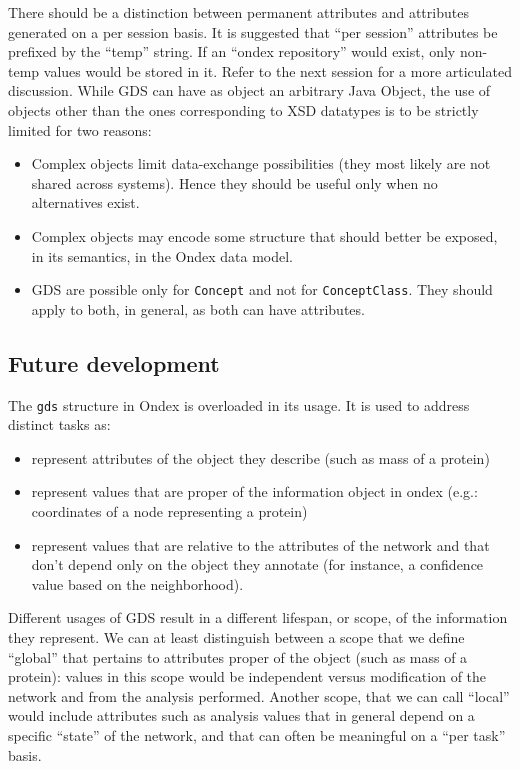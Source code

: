 \documentclass[a4paper,10pt]{article}
\newcommand{\term}[1]{\texttt{#1}\xspace}
\begin{document}
There should be a distinction between permanent attributes and attributes generated on a per session basis. It is suggested that ``per session'' attributes be prefixed by the ``temp'' string. If an ``ondex repository'' would exist, only non-temp values would be stored in it.
Refer to the next session for a more articulated discussion.
\vskip 0.5cm
While GDS can have as object an arbitrary Java Object, the use of objects other than the ones corresponding to XSD datatypes is to be strictly limited for two reasons:
\begin{itemize}
\item Complex objects limit data-exchange possibilities (they most likely are not shared across systems). Hence they should be useful only when no alternatives exist.
\item Complex objects may encode some structure that should better be exposed, in its semantics, in the Ondex data model.

\item GDS are possible only for \term{Concept} and not for \term{ConceptClass}. They should apply to both, in general, as both can have attributes. 

\end{itemize}



\subsection{Future development}
The \term{gds} structure in Ondex is overloaded in its usage. It is used to address distinct tasks as: 
\begin{itemize}
\item represent attributes of the object they describe (such as mass of a protein)
\item represent values that are proper of the information object in ondex (e.g.: coordinates of a node representing a protein)
\item represent values that are relative to the attributes of the network and that don't depend only on the object they annotate (for instance, a confidence value based on the neighborhood).
\end{itemize}

Different usages of GDS result in a different lifespan, or scope, of the information they represent. We can at least distinguish between a scope that we define ``global'' that pertains to attributes proper of the object (such as mass of a protein): values in this scope would be independent versus modification of the network and from the analysis performed.
Another scope, that we can call ``local'' would include attributes such as analysis values that in general depend on a specific ``state'' of the network, and that can often be meaningful on a ``per task'' basis.
\vskip 0.5cm
\end{document}
